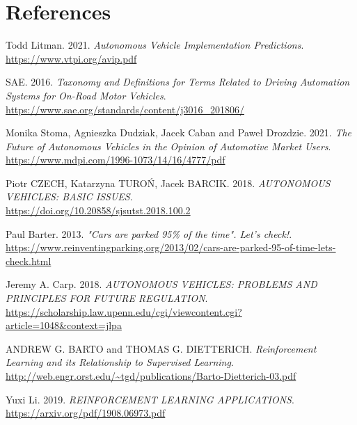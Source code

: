 \documentclass[14pt]{extarticle}
\begin{document}
\section{References}
\begingroup
\renewcommand{\section}[2]{}
\begin{thebibliography}{999}
  Todd Litman. 2021.
  \emph{Autonomous Vehicle Implementation Predictions}.\\
  \url{https://www.vtpi.org/avip.pdf}
  
  SAE. 2016.
  \emph{Taxonomy and Definitions for Terms Related to Driving Automation Systems for On-Road Motor Vehicles}.\\
  \url{https://www.sae.org/standards/content/j3016_201806/}
   
  Monika Stoma, Agnieszka Dudziak, Jacek Caban and Paweł Drozdzie. 2021.
  \emph{The Future of Autonomous Vehicles in the Opinion of Automotive
Market Users}.\\
  \url{https://www.mdpi.com/1996-1073/14/16/4777/pdf}
   
  Piotr CZECH, Katarzyna TUROŃ, Jacek BARCIK. 2018.
  \emph{AUTONOMOUS VEHICLES: BASIC ISSUES}.\\
  \url{https://doi.org/10.20858/sjsutst.2018.100.2}
  
  Paul Barter. 2013.
  \emph{"Cars are parked 95\% of the time". Let's check!}.\\
  \url{https://www.reinventingparking.org/2013/02/cars-are-parked-95-of-time-lets-check.html}
  
  Jeremy A. Carp. 2018.
  \emph{AUTONOMOUS VEHICLES: PROBLEMS AND PRINCIPLES FOR FUTURE REGULATION}.\\
  \url{https://scholarship.law.upenn.edu/cgi/viewcontent.cgi?article=1048&context=jlpa}
 
  ANDREW G. BARTO and THOMAS G. DIETTERICH.
  \emph{Reinforcement Learning and its Relationship to Supervised Learning}.\\
  \url{http://web.engr.orst.edu/~tgd/publications/Barto-Dietterich-03.pdf}
  
  Yuxi Li. 2019.
  \emph{REINFORCEMENT LEARNING APPLICATIONS}.\\
  \url{https://arxiv.org/pdf/1908.06973.pdf}
  

\end{thebibliography}
\end{document}
